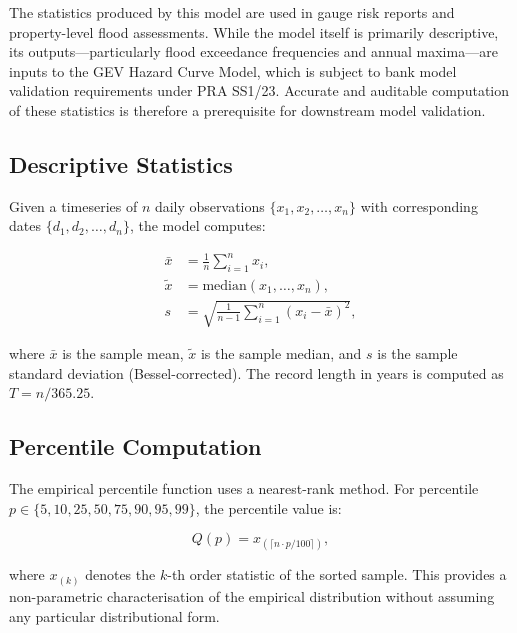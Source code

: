 \documentclass[11pt,a4paper]{article}
\begin{document}
The statistics produced by this model are used in gauge risk reports and property-level flood assessments. While the model itself is primarily descriptive, its outputs---particularly flood exceedance frequencies and annual maxima---are inputs to the GEV Hazard Curve Model, which is subject to bank model validation requirements under PRA SS1/23. Accurate and auditable computation of these statistics is therefore a prerequisite for downstream model validation.

\clearpage

\mkmframework

\subsection{Descriptive Statistics}

Given a timeseries of $n$ daily observations $\{x_1, x_2, \ldots, x_n\}$ with corresponding dates $\{d_1, d_2, \ldots, d_n\}$, the model computes:

\begin{align}
\bar{x} &= \frac{1}{n} \sum_{i=1}^{n} x_i, \label{eq:mean} \\[6pt]
\tilde{x} &= \text{median}(x_1, \ldots, x_n), \label{eq:median} \\[6pt]
s &= \sqrt{\frac{1}{n-1} \sum_{i=1}^{n} (x_i - \bar{x})^2}, \label{eq:stdev}
\end{align}

\noindent where $\bar{x}$ is the sample mean, $\tilde{x}$ is the sample median, and $s$ is the sample standard deviation (Bessel-corrected). The record length in years is computed as $T = n / 365.25$.

\subsection{Percentile Computation}

The empirical percentile function uses a nearest-rank method. For percentile $p \in \{5, 10, 25, 50, 75, 90, 95, 99\}$, the percentile value is:

\[
Q(p) = x_{(\lceil n \cdot p/100 \rceil)},
\]

\noindent where $x_{(k)}$ denotes the $k$-th order statistic of the sorted sample. This provides a non-parametric characterisation of the empirical distribution without assuming any particular distributional form.
\end{document}
